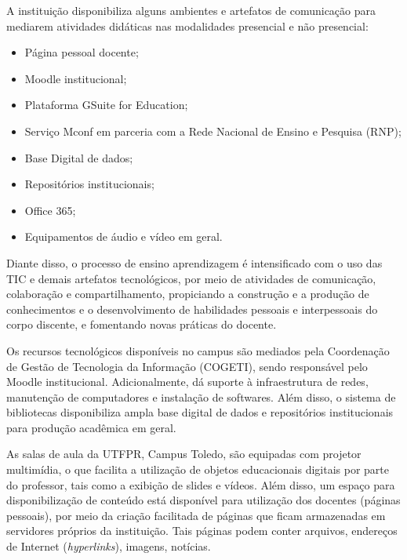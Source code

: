 

A instituição disponibiliza alguns ambientes e artefatos de comunicação para mediarem atividades didáticas nas modalidades presencial e não presencial:

\begin{itemize}
    \item Página pessoal docente;
    \item Moodle institucional;
    \item Plataforma GSuite for Education;
    \item Serviço Mconf em parceria com a Rede Nacional de Ensino e Pesquisa (RNP);
    \item Base Digital de dados;
    \item Repositórios institucionais;
    \item Office 365;
    \item Equipamentos de áudio e vídeo em geral.
\end{itemize}
    
Diante disso, o processo de ensino aprendizagem é intensificado com o uso das TIC e demais artefatos tecnológicos, por meio de atividades de comunicação, colaboração e compartilhamento, propiciando a construção e a produção de conhecimentos e o desenvolvimento de habilidades pessoais e interpessoais do corpo discente, e fomentando novas práticas do docente.

Os recursos tecnológicos disponíveis no campus são mediados pela Coordenação de Gestão de Tecnologia da Informação (COGETI), sendo responsável pelo Moodle institucional. Adicionalmente, dá suporte à infraestrutura de redes, manutenção de computadores e instalação de softwares. Além disso, o sistema de bibliotecas disponibiliza ampla base digital de dados e repositórios institucionais para produção acadêmica em geral.

As salas de aula da UTFPR, Campus Toledo, são equipadas com projetor multimídia, o que facilita a utilização de objetos educacionais digitais por parte do professor, tais como a exibição de slides e vídeos. Além disso, um espaço para disponibilização de conteúdo está disponível para utilização dos docentes (páginas pessoais), por meio da criação facilitada de páginas que ficam armazenadas em servidores próprios da instituição. Tais páginas podem conter arquivos, endereços de Internet (\textit{hyperlinks}), imagens, notícias.

